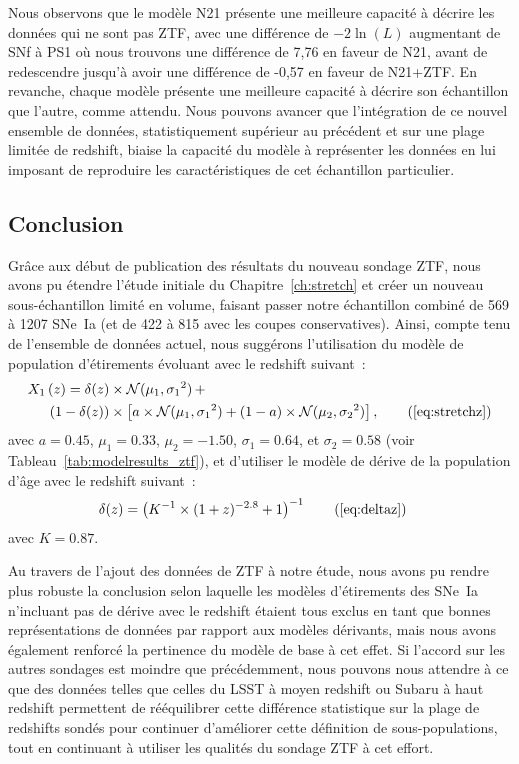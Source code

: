 \documentclass[../main/main.tex]{subfiles}
\begin{document}
Nous observons que le modèle N21 présente une meilleure capacité à décrire les
données qui ne sont pas ZTF, avec une différence de $-2\ln(L)$ augmentant de SNf
à PS1 où nous trouvons une différence de 7,76 en faveur de N21, avant de
redescendre jusqu'à avoir une différence de -0,57 en faveur de N21+ZTF. En
revanche, chaque modèle présente une meilleure capacité à décrire son
échantillon que l'autre, comme attendu. Nous pouvons avancer que l'intégration
de ce nouvel ensemble de données, statistiquement supérieur au précédent et sur
une plage limitée de redshift, biaise la capacité du modèle à représenter les
données en lui imposant de reproduire les caractéristiques de cet échantillon
particulier.

\subsection{Conclusion}\label{ssec:ztfconc}

Grâce aux début de publication des résultats du nouveau sondage ZTF, nous avons
pu étendre l'étude initiale du Chapitre~\ref{ch:stretch} et créer un nouveau
sous-échantillon limité en volume, faisant passer notre échantillon combiné de
569 à 1207 SNe~Ia (et de 422 à 815 avec les coupes conservatives). Ainsi, compte
tenu de l'ensemble de données actuel, nous suggérons l'utilisation du modèle de
population d'étirements évoluant avec le redshift suivant~:
\begin{align*}\label{eqconclusion:stretchz}
    X_1\left(z \right) =
        \delta(z)&\times\mathcal{N}(\mu_1,\sigma_1{}^2)\,+\nonumber\\
        (1-\delta(z))&\times \left[a\times\mathcal{N}(\mu_1,\sigma_1{}^2) +
        (1-a)\times\mathcal{N}(\mu_2,\sigma_2{}^2)\right],
    \tag{\ref{eq:stretchz}}
\end{align*}
avec $a=0.45$, $\mu_1=0.33$, $\mu_2=-1.50$, $\sigma_1=0.64$, et $\sigma_2=0.58$
(voir Tableau~\ref{tab:modelresults_ztf}), et d'utiliser le modèle de dérive
de la population d'âge avec le redshift suivant~:
\begin{align*}
    \delta(z) & = \left( K^{-1} \times (1+z)^{-2.8} +1 \right)^{-1}
    \tag{\ref{eq:deltaz}}
\end{align*}
avec $K=0.87$.

Au travers de l'ajout des données de ZTF à notre étude, nous avons pu rendre
plus robuste la conclusion selon laquelle les modèles d'étirements des SNe~Ia
n'incluant pas de dérive avec le redshift étaient tous exclus en tant que bonnes
représentations de données par rapport aux modèles dérivants, mais nous avons
également renforcé la pertinence du modèle de base à cet effet. Si l'accord sur
les autres sondages est moindre que précédemment, nous pouvons nous attendre à
ce que des données telles que celles du LSST à moyen redshift ou Subaru à haut
redshift permettent de rééquilibrer cette différence statistique sur la plage de
redshifts sondés pour continuer d'améliorer cette définition de
sous-populations, tout en continuant à utiliser les qualités du sondage ZTF à
cet effort.
\end{document}
